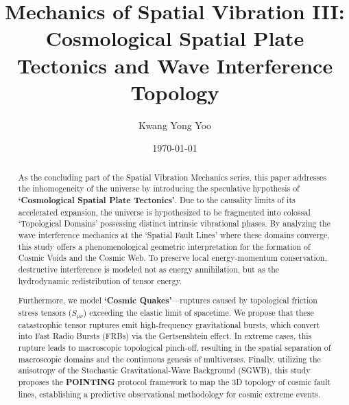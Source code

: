 \documentclass[reprint,amsmath,amssymb,aps,prd]{revtex4-2}
\begin{document}

\title{Mechanics of Spatial Vibration III: Cosmological Spatial Plate Tectonics and Wave Interference Topology}

\author{Kwang Yong Yoo}

\date{\today}

\begin{abstract}
As the concluding part of the Spatial Vibration Mechanics series, this paper addresses the inhomogeneity of the universe by introducing the speculative hypothesis of \textbf{`Cosmological Spatial Plate Tectonics'}. Due to the causality limits of its accelerated expansion, the universe is hypothesized to be fragmented into colossal `Topological Domains' possessing distinct intrinsic vibrational phases. By analyzing the wave interference mechanics at the `Spatial Fault Lines' where these domains converge, this study offers a phenomenological geometric interpretation for the formation of Cosmic Voids and the Cosmic Web. To preserve local energy-momentum conservation, destructive interference is modeled not as energy annihilation, but as the hydrodynamic redistribution of tensor energy.

Furthermore, we model \textbf{`Cosmic Quakes'}---ruptures caused by topological friction stress tensors ($S_{\mu\nu}$) exceeding the elastic limit of spacetime. We propose that these catastrophic tensor ruptures emit high-frequency gravitational bursts, which convert into Fast Radio Bursts (FRBs) via the Gertsenshtein effect. In extreme cases, this rupture leads to macroscopic topological pinch-off, resulting in the spatial separation of macroscopic domains and the continuous genesis of multiverses. Finally, utilizing the anisotropy of the Stochastic Gravitational-Wave Background (SGWB), this study proposes the \textbf{POINTING} protocol framework to map the 3D topology of cosmic fault lines, establishing a predictive observational methodology for cosmic extreme events.
\end{abstract}

\maketitle
\end{document}
